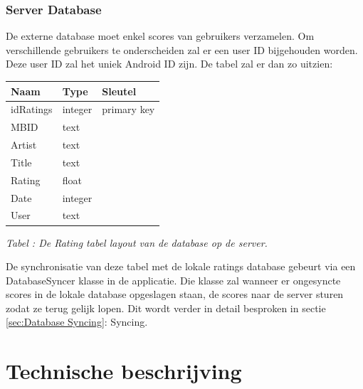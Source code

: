 \documentclass[11pt,a4paper]{article}
\newcounter{tabc}
\newcommand{\increaseTabID} {%
   \stepcounter{tabc}%
   \thetabc}
\newcommand{\tabID}[1]{\small \textit{Tabel \increaseTabID : #1} \\ \normalsize}
\begin{document}
\newpage
	\subsubsection{Server Database}
	\label{sec:Server Database}
	\label{sec:Extdb}
	De externe database moet enkel scores van gebruikers verzamelen. Om verschillende gebruikers te onderscheiden zal er een user ID bijgehouden worden. Deze user ID zal het uniek Android ID zijn. De tabel zal er dan zo uitzien: \\ \newline
		\begin{tabular}{| l | l | l | }
		\hline
		 Naam		& Type		& Sleutel		\\
		 \hline 
		 idRatings 	& integer 	& primary key 	\\
		 MBID 		& text 		& 				\\
		 Artist		& text 		& 				\\
		 Title 		& text 		& 				\\
		 Rating		& float 	& 				\\
		 Date 		& integer 	& 				\\
		 User		& text 		& 				\\
		\hline
		\end{tabular}
		\label{tab:extDB}
	
	\tabID{De Rating tabel layout van de database op de server.} 
		
	De synchronisatie van deze tabel met de lokale ratings database gebeurt via een DatabaseSyncer klasse in de applicatie. Die klasse zal wanneer er ongesyncte scores in de lokale database opgeslagen staan, de scores naar de server sturen zodat ze terug gelijk lopen. Dit wordt verder in detail besproken in sectie \ref{sec:Database Syncing}: Syncing.
	
\newpage %
\section{Technische beschrijving}
\label{sec:Technisch}
\end{document}
